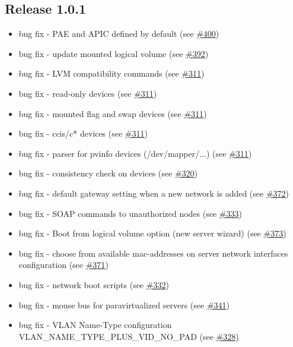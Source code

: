 \subsection{Release 1.0.1}

\begin{itemize}
\item bug fix - PAE and APIC defined by default (see \href{https://srcmaster.eurotux.com/pm/p/etva/ticket/400}{\#400})
\item bug fix - update mounted logical volume (see \href{https://srcmaster.eurotux.com/pm/p/etva/ticket/392}{\#392})
\item bug fix - LVM compatibility commands (see \href{https://srcmaster.eurotux.com/pm/p/etva/ticket/311}{\#311})
\item bug fix - read-only devices (see \href{https://srcmaster.eurotux.com/pm/p/etva/ticket/311}{\#311})
\item bug fix - mounted flag and swap devices (see \href{https://srcmaster.eurotux.com/pm/p/etva/ticket/311}{\#311})
\item bug fix - ccis/c* devices (see \href{https://srcmaster.eurotux.com/pm/p/etva/ticket/311}{\#311})
\item bug fix - parser for pvinfo devices (/dev/mapper/...) (see \href{https://srcmaster.eurotux.com/pm/p/etva/ticket/311}{\#311})
\item bug fix - consistency check on devices (see \href{https://srcmaster.eurotux.com/pm/p/etva/ticket/320}{\#320})
\item bug fix - default gateway setting when a new network is added (see \href{https://srcmaster.eurotux.com/pm/p/etva/ticket/372}{\#372})
\item bug fix - SOAP commands to unauthorized nodes (see \href{https://srcmaster.eurotux.com/pm/p/etva/ticket/333}{\#333})
\item bug fix - Boot from logical volume option (new server wizard) (see \href{https://srcmaster.eurotux.com/pm/p/etva/ticket/373}{\#373})
\item bug fix - choose from available mac-addresses on server network interfaces configuration (see \href{https://srcmaster.eurotux.com/pm/p/etva/ticket/371}{\#371})
\item bug fix - network boot scripts (see \href{https://srcmaster.eurotux.com/pm/p/etva/ticket/332}{\#332})
\item bug fix - mouse bus for paravirtualized servers (see \href{https://srcmaster.eurotux.com/pm/p/etva/ticket/341}{\#341})
\item bug fix - VLAN Name-Type configuration VLAN\_NAME\_TYPE\_PLUS\_VID\_NO\_PAD (see \href{https://srcmaster.eurotux.com/pm/p/etva/ticket/328}{\#328})

\end{itemize}
